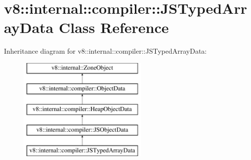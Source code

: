 \hypertarget{classv8_1_1internal_1_1compiler_1_1JSTypedArrayData}{}\section{v8\+:\+:internal\+:\+:compiler\+:\+:J\+S\+Typed\+Array\+Data Class Reference}
\label{classv8_1_1internal_1_1compiler_1_1JSTypedArrayData}
Inheritance diagram for v8\+:\+:internal\+:\+:compiler\+:\+:J\+S\+Typed\+Array\+Data\+:\begin{figure}[H]
\begin{center}
\leavevmode
\includegraphics[height=5.000000cm]{classv8_1_1internal_1_1compiler_1_1JSTypedArrayData}
\end{center}
\end{figure}
